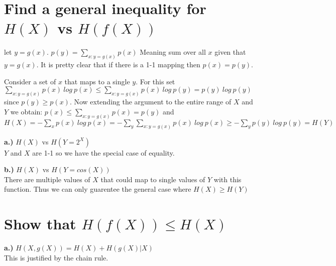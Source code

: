 \documentclass[10pt]{article}
\begin{document}
\begin{tiny}
\begin{multicols}{3}

\fontsize{4.99pt}{2pt}




\section* {Find a general inequality for $H(X)$ vs $H(f(X))$}
                          let $y=g(x)$. $p(y)=\sum_{x:y=g(x)}p(x)$ Meaning sum over all $x$ given that $y=g(x)$. It is pretty clear that if there is a 1-1 mapping then $p(x)=p(y)$. 
                          
                          Consider a set of $x$ that maps to a single $y$. For this set $\sum_{x:y=g(x)}p(x)\ log\ p(x) \leq \sum_{x:y=g(x)}p(x)\ log\ p(y) = p(y)\ log\ p(y)$ since $p(y)\geq p(x)$. Now extending the argument to the entire range of $X$ and $Y$ we obtain:
          \(
          p(x)\leq \sum_{x:y=g(x)}p(x)=p(y)\) and \(
          H(X)=-\sum_{x}p(x)\ log\ p(x)
          =-\sum_{y}\sum_{x:y=g(x)}p(x)\ log\ p(x)
          \geq -\sum_{y}p(y)\ log\ p(y)
          =H(Y)
          \)

          {\bf a.)} $H(X)$ vs $H(Y=2^{X})$\\
           $Y$ and $X$ are 1-1 so we have the special case of equality.

          {\bf b.)} $H(X)$ vs $H(Y=cos(X))$ \\
            There are multiple values of $X$ that could map to single values of $Y$ with this function. Thus we can only guarentee the general case where $H(X) \geq H(Y)$

\section*{ Show that $H(f(X))\leq H(X)$}
                  {\bf a.)} $H(X,g(X))=H(X) + H(g(X) | X)$\\
                    This is justified by the chain rule.
                    

\end{multicols}
\end{tiny}
\end{document}
